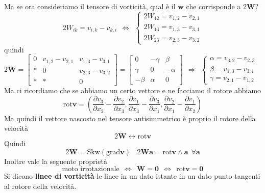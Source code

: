 \documentclass[10pt,a4paper,twoside]{book}
\begin{document}
Ma se ora consideriamo il tensore di vorticità, qual è il $\mathbf{w}$ che corrisponde a $2\mathbf{W}$?
\begin{equation*}
2W_{ik} =v_{i,k} -v_{k,i} \ \ \Leftrightarrow \ \ \begin{cases}
2W_{12} =v_{1,2} -v_{2,1}\\
2W_{13} =v_{1,3} -v_{3,1}\\
2W_{23} =v_{2,3} -v_{3,2}
\end{cases}
\end{equation*}
quindi
\begin{equation*}
2\mathbf{W} =\begin{bmatrix}
0 & v_{1,2} -v_{2,1} & v_{1,3} -v_{3,1}\\
* & 0 & v_{2,3} -v_{3,2}\\
* & * & 0
\end{bmatrix} =\begin{bmatrix}
0 & -\gamma  & \beta \\
\gamma  & 0 & -\alpha \\
-\beta  & \alpha  & 0
\end{bmatrix} \ \ \Rightarrow \ \ \begin{cases}
\alpha =v_{3,2} -v_{2,3} & \\
\beta =v_{1,3} -v_{3,1} & \\
\gamma =v_{2,1} -v_{1,2} & 
\end{cases}
\end{equation*}
Ma ci ricordiamo che se abbiamo un certo vettore e ne facciamo il rotore abbiamo
\begin{equation*}
\mathrm{rot}\mathbf{v} =\left(\frac{\partial v_{3}}{\partial x_{2}} -\frac{\partial v_{2}}{\partial x_{3}} ,\frac{\partial v_{1}}{\partial x_{3}} -\frac{\partial v_{3}}{\partial x_{1}} ,\frac{\partial v_{2}}{\partial x_{1}} -\frac{\partial v_{1}}{\partial x_{2}}\right)
\end{equation*}
Ma quindi il vettore nascosto nel tensore antisimmetrico è proprio il rotore della velocità
\begin{equation*}
2\mathbf{W} \leftrightarrow \mathrm{rot}\mathbf{v}
\end{equation*}
Quindi
\begin{equation*}
\boxed{2\mathbf{W} =\mathrm{Skw}(\mathrm{grad}\mathbf{v})} \ \ \ \ \boxed{2\mathbf{Wa} =\mathrm{rot}\mathbf{v} \land \mathbf{a} \ \ \forall \mathbf{a}}
\end{equation*}
Inoltre vale la seguente proprietà
\begin{equation*}
\boxed{\text{moto irrotazionale} \ \ \Leftrightarrow \ \ \mathbf{W} =\mathbf{0} \ \ \Leftrightarrow \ \ \mathrm{rot}\mathbf{v} =\mathbf{0}}
\end{equation*}
Si dicono \textbf{linee di vorticità} le linee in un dato istante in un dato punto tangenti al rotore della velocità.
\end{document}
